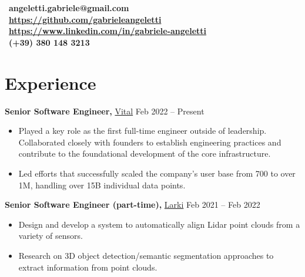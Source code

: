 \documentclass[margin]{res}
\begin{document}
    \begin{resume}
        \section{}
        \faEnvelope~\textbf{angeletti.gabriele@gmail.com} \\[5pt]
        \faGithub~\textbf{\url{https://github.com/gabrieleangeletti}} \\[5pt]
        \faLinkedin~\textbf{\url{https://www.linkedin.com/in/gabriele-angeletti}} \\[5pt]
        \faPhone~\textbf{(+39) 380 148 3213}

        \section{Experience}
            {\bf Senior Software Engineer, } \href{https://tryvital.io}{Vital}
            \hfill Feb 2022 -- Present
            \begin{itemize}
                \item Played a key role as the first full-time engineer outside of leadership. Collaborated closely with founders to establish engineering practices and contribute to the foundational development of the core infrastructure.
                \item Led efforts that successfully scaled the company's user base from 700 to over 1M, handling over 15B individual data points.
            \end{itemize}
        
            {\bf Senior Software Engineer (part-time),} \href{https://larki.com.au/}{Larki}
            \hfill Feb 2021 -- Feb 2022
            \begin{itemize}
                \item Design and develop a system to automatically align Lidar point clouds from a variety of sensors.
                \item Research on 3D object detection/semantic segmentation approaches to extract information from point clouds.
            \end{itemize}


\end{resume}
\end{document}
